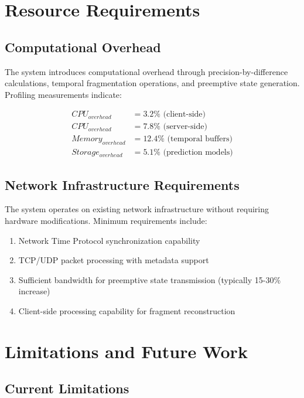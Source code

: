 \documentclass[12pt,a4paper]{article}
\begin{document}
\section{Resource Requirements}

\subsection{Computational Overhead}

The system introduces computational overhead through precision-by-difference calculations, temporal fragmentation operations, and preemptive state generation. Profiling measurements indicate:

\begin{align}
CPU_{overhead} &= 3.2\% \text{ (client-side)} \\
CPU_{overhead} &= 7.8\% \text{ (server-side)} \\
Memory_{overhead} &= 12.4\% \text{ (temporal buffers)} \\
Storage_{overhead} &= 5.1\% \text{ (prediction models)}
\end{align}

\subsection{Network Infrastructure Requirements}

The system operates on existing network infrastructure without requiring hardware modifications. Minimum requirements include:

\begin{enumerate}
\item Network Time Protocol synchronization capability
\item TCP/UDP packet processing with metadata support  
\item Sufficient bandwidth for preemptive state transmission (typically 15-30\% increase)
\item Client-side processing capability for fragment reconstruction
\end{enumerate}

\section{Limitations and Future Work}

\subsection{Current Limitations}
\end{document}
